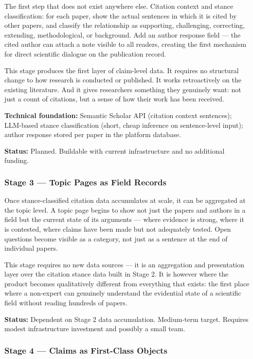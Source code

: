 The first step that does not exist anywhere else. Citation context and stance
classification: for each paper, show the actual sentences in which it is cited
by other papers, and classify the relationship as supporting, challenging,
correcting, extending, methodological, or background. Add an author response
field — the cited author can attach a note visible to all readers, creating
the first mechanism for direct scientific dialogue on the publication record.

This stage produces the first layer of claim-level data. It requires no
structural change to how research is conducted or published. It works
retroactively on the existing literature. And it gives researchers something
they genuinely want: not just a count of citations, but a sense of how their
work has been received.

\textbf{Technical foundation:} Semantic Scholar API (citation context
sentences); LLM-based stance classification (short, cheap inference on
sentence-level input); author response stored per paper in the platform
database.

\textbf{Status:} Planned. Buildable with current infrastructure and no
additional funding.

\subsubsection*{Stage 3 — Topic Pages as Field Records}

Once stance-classified citation data accumulates at scale, it can be
aggregated at the topic level. A topic page begins to show not just the
papers and authors in a field but the current state of its arguments —
where evidence is strong, where it is contested, where claims have been
made but not adequately tested. Open questions become visible as a category,
not just as a sentence at the end of individual papers.

This stage requires no new data sources — it is an aggregation and
presentation layer over the citation stance data built in Stage 2. It is
however where the product becomes qualitatively different from everything
that exists: the first place where a non-expert can genuinely understand the
evidential state of a scientific field without reading hundreds of papers.

\textbf{Status:} Dependent on Stage 2 data accumulation. Medium-term target.
Requires modest infrastructure investment and possibly a small team.

\subsubsection*{Stage 4 — Claims as First-Class Objects}

